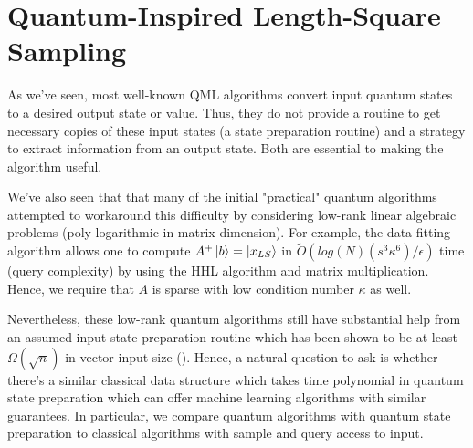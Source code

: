 \documentclass[main.tex]{subfiles}
\begin{document}
%
%
%

\chapter{Quantum-Inspired Length-Square Sampling}
\label{sec:tang}

As we've seen, most well-known QML algorithms convert input quantum states to a desired output state or value. Thus, they do not provide a routine to get necessary copies of these input states (a state preparation routine) and a strategy to extract information from an output state. Both are essential to making the algorithm useful.

We've also seen that that many of the initial "practical" quantum algorithms attempted to workaround this difficulty by considering low-rank linear algebraic problems (poly-logarithmic in matrix dimension). For example, the data fitting algorithm \cite{wiebe2012quantum} allows one to compute $A^+ \ket{b} = \ket{x_{LS}}$ in $\tilde{O}(log(N)(s^3\kappa^6)/ \epsilon)$ time (query complexity) by using the HHL algorithm and matrix multiplication. Hence, we require that $A$ is sparse with low condition number $\kappa$ as well.

Nevertheless, these low-rank quantum algorithms still have substantial help from an assumed input state preparation routine which has been shown to be at least $\Omega(\sqrt{n})$ in vector input size (\cite{tang2018quantum}). Hence, a natural question to ask is whether there's a similar classical data structure which takes time polynomial in quantum state preparation which can offer machine learning algorithms with similar guarantees. In particular, we compare quantum algorithms with quantum state preparation to classical algorithms with sample and query access to input.	
\end{document}
